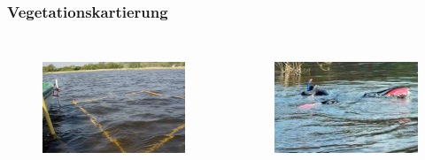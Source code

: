 \documentclass[xcolor=dvipsnames]{beamer}
\begin{document}
\begin{frame}
\frametitle{Vegetationskartierung}
\begin{columns}
\begin{column}{5.5cm}
\begin{figure}
\includegraphics[height=35mm]{images/Fotos/vegetationsrahmen.jpg}
\end{figure}
\end{column}
\begin{column}{5.5cm}
\begin{figure}
\includegraphics[height=35mm]{images/Fotos/schnorchelnklein2.jpg}
\vspace*{+5mm}
\end{figure}
\end{column}
\end{columns}
\end{frame}
\end{document}
